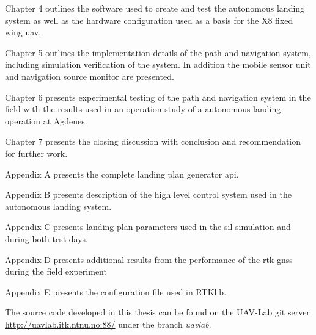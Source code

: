Chapter 4 outlines the software used to create and test the autonomous landing system as well as the hardware configuration used as a basis for the X8 fixed wing \gls{uav}.

Chapter 5 outlines the implementation details of the path and navigation system, including simulation verification of the system. In addition the mobile sensor unit and navigation source monitor are presented.

Chapter 6 presents experimental testing of the path and navigation system in the field with the results used in an operation study of a autonomous landing operation at Agdenes.

Chapter 7 presents the closing discussion with conclusion and recommendation for further work.

Appendix A presents the complete landing plan generator \gls{api}.

Appendix B presents description of the high level control system used in the autonomous landing system.

Appendix C presents landing plan parameters used in the \gls{sil} simulation and during both test days.

Appendix D presents additional results from the performance of the \gls{rtk-gnss} during the field experiment

Appendix E presents the configuration file used in RTKlib.

The source code developed in this thesis can be found on the UAV-Lab git server \url{http://uavlab.itk.ntnu.no:88/} under the branch \textit{uavlab}.
\cleardoublepage